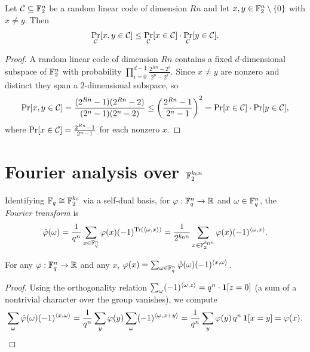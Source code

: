 \begin{lemma}
  \label{lem:negative-correlation}
  Let $\mathcal{C} \subseteq \mathbb{F}_2^n$ be a random linear code of dimension $Rn$ and
  let $x,y \in \mathbb{F}_2^n \setminus \{0\}$ with $x \neq y$. Then
  \[
    \Pr_{\mathcal{C}}[x,y \in \mathcal{C}] \leq \Pr_{\mathcal{C}}[x \in \mathcal{C}]\cdot
      \Pr_{\mathcal{C}}[y \in \mathcal{C}].
  \]
\end{lemma}
\begin{proof}
  A random linear code of dimension $Rn$ contains a fixed $d$-dimensional
  subspace of $\mathbb{F}_2^n$ with probability $\prod_{i=0}^{d-1}
  \frac{2^{Rn}-2^i}{2^n - 2^i}$. Since $x \neq y$ are nonzero and distinct they
  span a $2$-dimensional subspace, so
  \[
    \Pr[x,y \in \mathcal{C}] = \frac{(2^{Rn}-1)(2^{Rn}-2)}{(2^n-1)(2^n-2)}
      \leq \left(\frac{2^{Rn}-1}{2^n-1}\right)^2 = \Pr[x \in \mathcal{C}]\cdot
      \Pr[y \in \mathcal{C}],
  \]
  where $\Pr[x \in \mathcal{C}] = \frac{2^{Rn}-1}{2^n-1}$ for each nonzero $x$.
\end{proof}

\section{Fourier analysis over $\mathbb{F}_2^{k_0 n}$}

\begin{definition}
  \label{def:fourier}
  Identifying $\mathbb{F}_q \cong \mathbb{F}_2^{k_0}$ via a self-dual basis, for
  $\varphi : \mathbb{F}_q^n \to \mathbb{R}$ and $\omega \in \mathbb{F}_q^n$, the \emph{Fourier transform}
  is
  \[
    \hat{\varphi}(\omega) = \frac{1}{q^n}\sum_{x \in \mathbb{F}_q^n}\varphi(x)
      (-1)^{\operatorname{Tr}(\langle \omega, x\rangle)}
      = \frac{1}{2^{k_0 n}}\sum_{x \in \mathbb{F}_2^{k_0 n}}\varphi(x)
      (-1)^{\langle \omega, x\rangle} .
  \]
\end{definition}

\begin{lemma}
  \label{lem:fourier-inversion}
  For any $\varphi : \mathbb{F}_q^n \to \mathbb{R}$ and any $x$,
  $\varphi(x) = \sum_{\omega \in \mathbb{F}_q^n}\hat{\varphi}(\omega)(-1)^{\langle x, \omega\rangle}$.
\end{lemma}
\begin{proof}
  Using the orthogonality relation $\sum_{\omega}(-1)^{\langle \omega, z\rangle} = q^n
  \cdot \mathbf{1}[z = 0]$ (a sum of a nontrivial character over the group
  vanishes), we compute
  \[
    \sum_{\omega}\hat{\varphi}(\omega)(-1)^{\langle x, \omega\rangle}
      = \frac{1}{q^n}\sum_y \varphi(y)\sum_\omega (-1)^{\langle \omega, x+y\rangle}
      = \frac{1}{q^n}\sum_y \varphi(y)\,q^n\,\mathbf{1}[x = y] = \varphi(x).
  \]
\end{proof}

